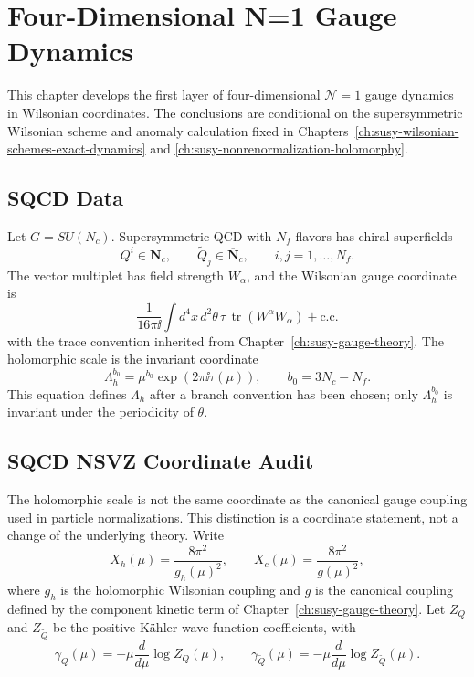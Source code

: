 \chapter{Four-Dimensional N=1 Gauge Dynamics}
\label{ch:susy-four-dimensional-n1-gauge-dynamics}

\ConventionsLorentzian

This chapter develops the first layer of four-dimensional \(\mathcal N=1\)
gauge dynamics in Wilsonian coordinates.  The conclusions are conditional on
the supersymmetric Wilsonian scheme and anomaly calculation fixed in
Chapters~\ref{ch:susy-wilsonian-schemes-exact-dynamics} and
\ref{ch:susy-nonrenormalization-holomorphy}.

\section{SQCD Data}

Let \(G=SU(N_c)\).  Supersymmetric QCD with \(N_f\) flavors has chiral
superfields
\[
  Q^i\in \mathbf N_c,\qquad
  \widetilde Q_j\in \overline{\mathbf N}_c,
  \qquad i,j=1,\ldots,N_f .
\]
The vector multiplet has field strength \(W_\alpha\), and the Wilsonian gauge
coordinate is
\[
  \frac{1}{16\pi\ii}\int d^4x\,d^2\theta\,
  \tau\,\operatorname{tr}(W^\alpha W_\alpha)+\text{c.c.}
\]
with the trace convention inherited from Chapter~\ref{ch:susy-gauge-theory}.
The holomorphic scale is the invariant coordinate
\[
  \Lambda_h^{b_0}
  =
  \mu^{b_0}\exp(2\pi\ii\tau(\mu)),
  \qquad
  b_0=3N_c-N_f .
\]
This equation defines \(\Lambda_h\) after a branch convention has been chosen;
only \(\Lambda_h^{b_0}\) is invariant under the periodicity of \(\theta\).

\section{SQCD NSVZ Coordinate Audit}
\label{sec:sqcd-nsvz-coordinate-audit}

The holomorphic scale is not the same coordinate as the canonical gauge
coupling used in particle normalizations.  This distinction is a coordinate
statement, not a change of the underlying theory.  Write
\[
  X_h(\mu)=\frac{8\pi^2}{g_h(\mu)^2},\qquad
  X_c(\mu)=\frac{8\pi^2}{g(\mu)^2},
\]
where \(g_h\) is the holomorphic Wilsonian coupling and \(g\) is the
canonical coupling defined by the component kinetic term of
Chapter~\ref{ch:susy-gauge-theory}.  Let \(Z_Q\) and
\(Z_{\widetilde Q}\) be the positive Kähler wave-function coefficients, with
\[
  \gamma_Q(\mu)=-\mu\frac{d}{d\mu}\log Z_Q(\mu),
  \qquad
  \gamma_{\widetilde Q}(\mu)
  =
  -\mu\frac{d}{d\mu}\log Z_{\widetilde Q}(\mu).
\]

